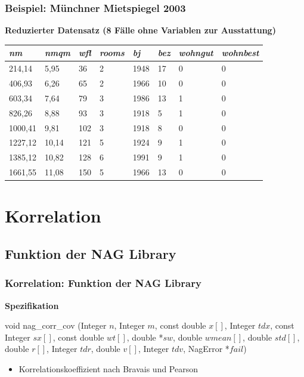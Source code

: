 \documentclass{beamer}
\begin{document}
\begin{frame}
	\frametitle{Beispiel: Münchner Mietspiegel 2003}
	
	\par \textbf{Reduzierter Datensatz (8 Fälle ohne Variablen zur Ausstattung)}\\[3mm]
	
	\begin{tabular}[ht]{|l|l|l|l|l|l|l|l|}
  	\hline
  	\textit{nm} & \textit{nmqm} & \textit{wfl} & \textit{rooms} & \textit{bj} & \textit{bez} & \textit{wohngut} & \textit{wohnbest}\\
  	\hline \hline
  	214,14 & 5,95 & 36 & 2 & 1948 & 17 & 0 & 0\\ \hline
  	406,93 & 6,26 & 65 & 2 & 1966 & 10 & 0 & 0\\ \hline
		603,34 & 7,64 & 79 & 3 & 1986 & 13 & 1 & 0\\ \hline
		826,26 & 8,88 & 93 & 3 & 1918 & 5 & 1 &0\\ \hline
		1000,41 & 9,81 & 102 & 3 & 1918 & 8 & 0 & 0\\ \hline
		1227,12 & 10,14 & 121 & 5 & 1924 & 9 & 1 & 0\\ \hline
		1385,12 & 10,82 & 128 & 6 & 1991 & 9 & 1 & 0\\ \hline
		1661,55 & 11,08 & 150 & 5 & 1966 & 13 & 0 & 0\\
  	\hline
	\end{tabular}
\end{frame}

\section{Korrelation}

\subsection{Funktion der NAG Library}

\begin{frame}
	\frametitle{Korrelation: Funktion der NAG Library}
	
	\par \textbf{Spezifikation}\\[3mm]
	
	\par void nag\_corr\_cov (Integer $n$, Integer $m$, const double $x[]$, Integer $tdx$,
	\hspace*{5mm} const Integer $sx[]$, const double $wt[]$, double *$sw$, double $wmean[]$,
	\hspace*{5mm} double $std[]$, double $r[]$, Integer $tdr$, double $v[]$, Integer $tdv$,
	\hspace*{5mm} NagError *$fail$)
	
	\begin{itemize}
		\item Korrelationskoeffizient nach Bravais und Pearson
	\end{itemize}
\end{frame}
\end{document}
